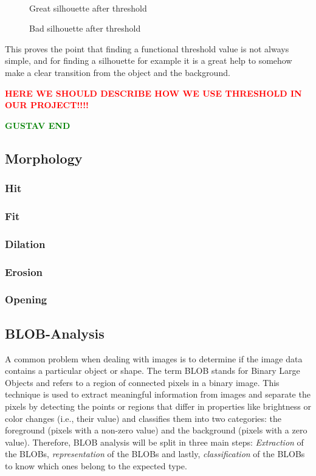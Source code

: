 \begin{figure}[htbp]
\begin{minipage}[b]{0.45\textwidth}
\end{minipage} \\ %
\begin{minipage}[t]{0.45\textwidth}
\caption{Great silhouette after threshold} %
\label{fig:SimpleThresholdAfter}
\end{minipage} \hfill
\begin{minipage}[t]{0.45\textwidth}
\caption{Bad silhouette after threshold} %
\label{fig:ComplicatedThresholdAfter}
\end{minipage}
\end{figure}
 
This proves the point that finding a functional threshold value is not always simple, and for finding a silhouette for example it is a great help to somehow make a clear transition from the object and the background.
 
\textbf{\textcolor{red}{HERE WE SHOULD DESCRIBE HOW WE USE THRESHOLD IN OUR PROJECT!!!!}}

\textbf{\textcolor{green}{GUSTAV END}}

\subsection{Morphology}
\subsubsection{Hit}
\subsubsection{Fit}
\subsubsection{Dilation}
\subsubsection{Erosion}
\subsubsection{Opening}
\subsection{BLOB-Analysis}
A common problem when dealing with images is to determine if the image data contains a particular object or shape. The term BLOB stands for Binary Large Objects and refers to a region of connected pixels in a binary image. This technique is used to extract meaningful information from images and separate the pixels by detecting the points or regions that differ in properties like brightness or color changes (i.e., their value) and classifies them into two categories: the foreground (pixels with a non-zero value) and the background (pixels with a zero value).
Therefore, BLOB analysis will be split in three main steps: \textit{Extraction} of the BLOBs, \textit{representation} of the BLOBs and lastly, \textit{classification} of the BLOBs to know which ones belong to the expected type.
